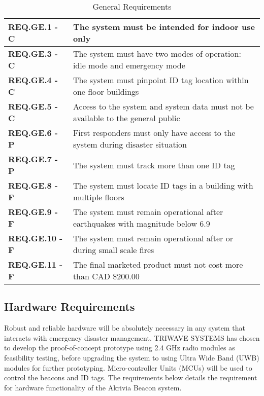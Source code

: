\bgroup
\def\arraystretch{1.5}
\begin{table}[H]
\centering
\begin{tabular}{ | m{3.25cm} | m{12.5cm} |} 
 \hline
 \textbf{REQ.GE.1 - C} & The system must be intended for indoor use only \\ 
\hline
 \textbf{REQ.GE.3 - C} & The system must have two modes of operation: idle mode and emergency mode \\ 
\hline
 \textbf{REQ.GE.4 - C} & The system must pinpoint ID tag location within one floor buildings \\
\hline
 \textbf{REQ.GE.5 - C} & Access to the system and system data must not be available to the general public \\
\hline
 \textbf{REQ.GE.6 - P} & First responders must only have access to the system during disaster situation \\
\hline
 \textbf{REQ.GE.7 - P} & The system must track more than one ID tag \\
\hline
 \textbf{REQ.GE.8 - F} & The system must locate ID tags in a building with multiple floors \\
\hline
 \textbf{REQ.GE.9 - F} & The system must remain operational after earthquakes with magnitude below 6.9 \\
\hline
 \textbf{REQ.GE.10 - F} & The system must remain operational after or during small scale fires \\
\hline
 \textbf{REQ.GE.11 - F} & The final marketed product must not cost more than CAD \$200.00 \\
\hline
\end{tabular}
\caption{General Requirements}
\end{table}	

\break
\subsection{Hardware Requirements}
Robust and reliable hardware will be absolutely necessary in any system that interacts with emergency disaster management. TRIWAVE SYSTEMS has chosen to develop the proof-of-concept prototype using 2.4 GHz radio modules as feasibility testing, before upgrading the system to using Ultra Wide Band (UWB) modules for further prototyping. Micro-controller Units (MCUs) will be used to control the beacons and ID tags. The requirements below details the requirement for hardware functionality of the Akrivia Beacon system.

\bigskip


